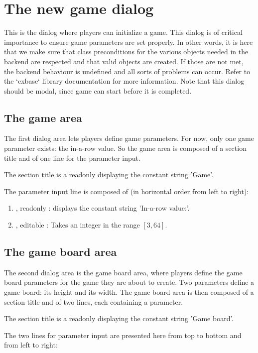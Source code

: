 \section{The new game dialog} \label{dlg:NewGame}
This is the dialog where players can initialize a game. This dialog is of critical
importance to ensure game parameters are set properly. In other words, it is here
that we make sure that class preconditions for the various objects needed in the
backend are respected and that valid objects are created. If those are not met,
the backend behaviour is undefined and all sorts of problems can occur. Refer to
the `cxbase` library documentation for more information. Note that this dialog
should be modal, since game can start before it is completed.


  \subsection{The game area}
  The first dialog area lets players define game parameters. For now, only one game
  parameter exists: the in-a-row value. So the game area is composed of a section
  title and of one line for the parameter input.

  The section title is a readonly  displaying the constant string 'Game'.

  The parameter input line is composed of (in horizontal order from left to right):

  \begin{enumerate}
    \item {}   , readonly : displays the constant string 'In-a-row value:'.
    \item {}, editable : Takes an integer in the range $[3, 64]$.
  \end{enumerate}


  \subsection{The game board area}
  The second dialog area is the game board area, where players define the game
  board parameters for the game they are about to create. Two parameters define
  a game board: its height and its width. The game board area is then composed
  of a section title and of two lines, each containing a parameter.

  The section title is a readonly  displaying the constant string
  'Game board'.

  The two lines for parameter input are presented here from top to bottom and
  from left to right:

